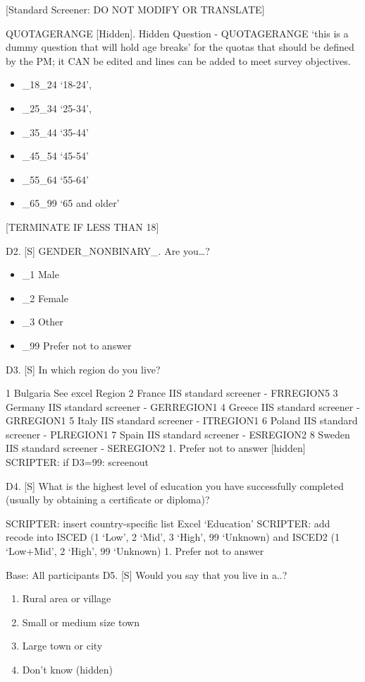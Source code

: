 \documentclass[
  12pt,
  a4paper,
]{article}
\providecommand{\tightlist}{%
  \setlength{\itemsep}{0pt}\setlength{\parskip}{0pt}}
\begin{document}
{[}Standard Screener: DO NOT MODIFY OR TRANSLATE{]}

QUOTAGERANGE {[}Hidden{]}. Hidden Question - QUOTAGERANGE `this is a dummy question that will hold age breaks' for the quotas that should be defined by the PM; it CAN be edited and lines can be added to meet survey objectives.

\begin{itemize}
\tightlist
\item
  \_18\_24 `18-24',
\item
  \_25\_34 `25-34',
\item
  \_35\_44 `35-44'
\item
  \_45\_54 `45-54'
\item
  \_55\_64 `55-64'
\item
  \_65\_99 `65 and older'
\end{itemize}

{[}TERMINATE IF LESS THAN 18{]}

D2. {[}S{]} GENDER\_NONBINARY\_. Are you\ldots?

\begin{itemize}
\tightlist
\item
  \_1 Male
\item
  \_2 Female
\item
  \_3 Other
\item
  \_99 Prefer not to answer
\end{itemize}

D3. {[}S{]} In which region do you live?

1 Bulgaria See excel Region
2 France IIS standard screener - FRREGION5
3 Germany IIS standard screener - GERREGION1
4 Greece IIS standard screener - GRREGION1
5 Italy IIS standard screener - ITREGION1
6 Poland IIS standard screener - PLREGION1
7 Spain IIS standard screener - ESREGION2
8 Sweden IIS standard screener - SEREGION2
1. Prefer not to answer {[}hidden{]}\\
SCRIPTER: if D3=99: screenout

D4. {[}S{]} What is the highest level of education you have successfully completed (usually by obtaining a certificate or diploma)?

SCRIPTER: insert country-specific list Excel `Education'
SCRIPTER: add recode into ISCED (1 `Low', 2 `Mid', 3 `High', 99 `Unknown) and ISCED2 (1 `Low+Mid', 2 `High', 99 `Unknown)
1. Prefer not to answer

Base: All participants
D5. {[}S{]} Would you say that you live in a..?

\begin{enumerate}
\def\labelenumi{\arabic{enumi}.}
\tightlist
\item
  Rural area or village\\
\item
  Small or medium size town\\
\item
  Large town or city\\
\item
  Don't know (hidden)
\end{enumerate}
\end{document}
